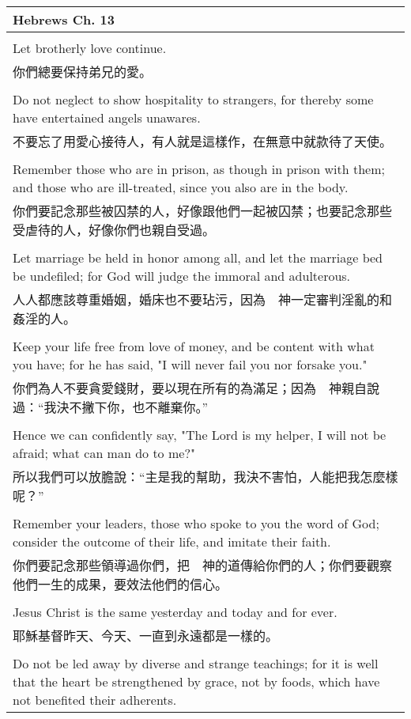 \begin{tabularx}{\textwidth}{p{}}
\hline
Hebrews Ch. 13 \\
\hline \\
Let brotherly love continue. \\
你們總要保持弟兄的愛。 \\ \\
Do not neglect to show hospitality to strangers, for thereby some have entertained angels unawares. \\
不要忘了用愛心接待人，有人就是這樣作，在無意中就款待了天使。 \\ \\
Remember those who are in prison, as though in prison with them; and those who are ill-treated, since you also are in the body. \\
你們要記念那些被囚禁的人，好像跟他們一起被囚禁；也要記念那些受虐待的人，好像你們也親自受過。 \\ \\
Let marriage be held in honor among all, and let the marriage bed be undefiled; for God will judge the immoral and adulterous. \\
人人都應該尊重婚姻，婚床也不要玷污，因為　神一定審判淫亂的和姦淫的人。 \\ \\
Keep your life free from love of money, and be content with what you have; for he has said, "I will never fail you nor forsake you." \\
你們為人不要貪愛錢財，要以現在所有的為滿足；因為　神親自說過：“我決不撇下你，也不離棄你。” \\ \\
Hence we can confidently say, "The Lord is my helper, I will not be afraid; what can man do to me?" \\
所以我們可以放膽說：“主是我的幫助，我決不害怕，人能把我怎麼樣呢？” \\ \\
Remember your leaders, those who spoke to you the word of God; consider the outcome of their life, and imitate their faith. \\
你們要記念那些領導過你們，把　神的道傳給你們的人；你們要觀察他們一生的成果，要效法他們的信心。 \\ \\
Jesus Christ is the same yesterday and today and for ever. \\
耶穌基督昨天、今天、一直到永遠都是一樣的。 \\ \\
Do not be led away by diverse and strange teachings; for it is well that the heart be strengthened by grace, not by foods, which have not benefited their adherents. \\

\end{tabularx}
